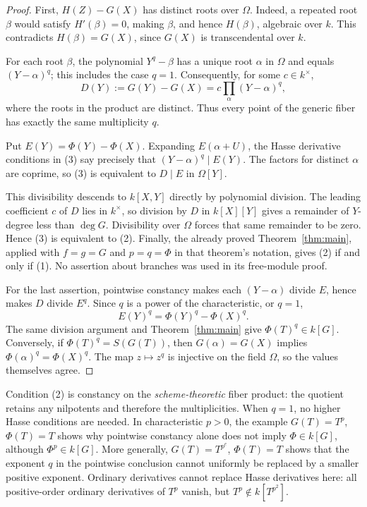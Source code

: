 \documentclass[11pt]{article}
\theoremstyle{plain}
\theoremstyle{definition}
\theoremstyle{remark}
\begin{document}
\begin{proof}
First, \(H(Z)-G(X)\) has distinct roots over \(\Omega\). Indeed, a repeated root \(\beta\) would satisfy \(H'(\beta)=0\), making \(\beta\), and hence \(H(\beta)\), algebraic over \(k\). This contradicts \(H(\beta)=G(X)\), since \(G(X)\) is transcendental over \(k\).

For each root \(\beta\), the polynomial \(Y^q-\beta\) has a unique root \(\alpha\) in \(\Omega\) and equals \((Y-\alpha)^q\); this includes the case \(q=1\). Consequently, for some \(c\in k^\times\),
\[
    D(Y):=G(Y)-G(X)=c\prod_{\alpha}(Y-\alpha)^q,
\]
where the roots in the product are distinct. Thus every point of the generic fiber has exactly the same multiplicity \(q\).

Put \(E(Y)=\Phi(Y)-\Phi(X)\). Expanding \(E(\alpha+U)\), the Hasse derivative conditions in (3) say precisely that \((Y-\alpha)^q\mid E(Y)\). The factors for distinct \(\alpha\) are coprime, so (3) is equivalent to \(D\mid E\) in \(\Omega[Y]\).

This divisibility descends to \(k[X,Y]\) directly by polynomial division. The leading coefficient \(c\) of \(D\) lies in \(k^\times\), so division by \(D\) in \(k[X][Y]\) gives a remainder of \(Y\)-degree less than \(\deg G\). Divisibility over \(\Omega\) forces that same remainder to be zero. Hence (3) is equivalent to (2). Finally, the already proved Theorem~\ref{thm:main}, applied with \(f=g=G\) and \(p=q=\Phi\) in that theorem's notation, gives (2) if and only if (1). No assertion about branches was used in its free-module proof.

For the last assertion, pointwise constancy makes each \((Y-\alpha)\) divide \(E\), hence makes \(D\) divide \(E^q\). Since \(q\) is a power of the characteristic, or \(q=1\),
\[
    E(Y)^q=\Phi(Y)^q-\Phi(X)^q.
\]
The same division argument and Theorem~\ref{thm:main} give \(\Phi(T)^q\in k[G]\). Conversely, if \(\Phi(T)^q=S(G(T))\), then \(G(\alpha)=G(X)\) implies \(\Phi(\alpha)^q=\Phi(X)^q\). The map \(z\mapsto z^q\) is injective on the field \(\Omega\), so the values themselves agree.
\end{proof}

Condition (2) is constancy on the \emph{scheme-theoretic} fiber product: the quotient retains any nilpotents and therefore the multiplicities. When \(q=1\), no higher Hasse conditions are needed. In characteristic \(p>0\), the example \(G(T)=T^p\), \(\Phi(T)=T\) shows why pointwise constancy alone does not imply \(\Phi\in k[G]\), although \(\Phi^p\in k[G]\). More generally, \(G(T)=T^{p^e}\), \(\Phi(T)=T\) shows that the exponent \(q\) in the pointwise conclusion cannot uniformly be replaced by a smaller positive exponent. Ordinary derivatives cannot replace Hasse derivatives here: all positive-order ordinary derivatives of \(T^p\) vanish, but \(T^p\notin k[T^{p^2}]\).
\end{document}
